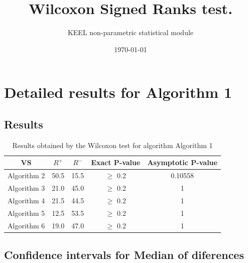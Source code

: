 \documentclass[a4paper,10pt]{article}
\title{Wilcoxon Signed Ranks test.}
\date{\today}
\author{KEEL non-parametric statistical module}
\begin{document}
\pagestyle{empty}
\maketitle
\thispagestyle{empty}



\section{Detailed results for Algorithm 1}


\subsection{Results}

\begin{table}[!htp]
\centering\small
\begin{tabular}{
|c|c|c|c|c|}
\hline
 VS & $R^{+}$ & $R^{-}$ & Exact P-value & Asymptotic P-value \\ \hline 
Algorithm 2 & 50.5 & 15.5 & $\geq$ 0.2 & 0.10558\\ \hline 
Algorithm 3 & 21.0 & 45.0 & $\geq$ 0.2 & 1\\ \hline 
Algorithm 4 & 21.5 & 44.5 & $\geq$ 0.2 & 1\\ \hline 
Algorithm 5 & 12.5 & 53.5 & $\geq$ 0.2 & 1\\ \hline 
Algorithm 6 & 19.0 & 47.0 & $\geq$ 0.2 & 1\\ \hline 

\end{tabular}
\caption{Results obtained by the Wilcoxon test for algorithm Algorithm 1}
\end{table}

\subsection{Confidence intervals for Median of diferences}
\end{document}
